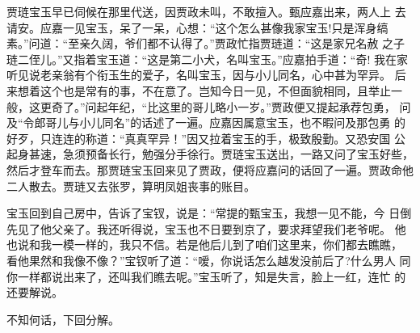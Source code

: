贾琏宝玉早已伺候在那里代送，因贾政未叫，不敢擅入。甄应嘉出来，两人上
去请安。应嘉一见宝玉，呆了一呆，心想：“这个怎么甚像我家宝玉!只是浑身缟
素。”问道：“至亲久阔，爷们都不认得了。”贾政忙指贾琏道：“这是家兄名赦
之子琏二侄儿。”又指着宝玉道：“这是第二小犬，名叫宝玉。”应嘉拍手道：“奇!
我在家听见说老亲翁有个衔玉生的爱子，名叫宝玉，因与小儿同名，心中甚为罕异。
后来想着这个也是常有的事，不在意了。岂知今日一见，不但面貌相同，且举止一
般，这更奇了。”问起年纪，“比这里的哥儿略小一岁。”贾政便又提起承荐包勇，
问及“令郎哥儿与小儿同名”的话述了一遍。应嘉因属意宝玉，也不暇问及那包勇
的好歹，只连连的称道：“真真罕异！”因又拉着宝玉的手，极致殷勤。又恐安国
公起身甚速，急须预备长行，勉强分手徐行。贾琏宝玉送出，一路又问了宝玉好些，
然后才登车而去。那贾琏宝玉回来见了贾政，便将应嘉问的话回了一遍。贾政命他
二人散去。贾琏又去张罗，算明凤姐丧事的账目。

宝玉回到自己房中，告诉了宝钗，说是：“常提的甄宝玉，我想一见不能，今
日倒先见了他父亲了。我还听得说，宝玉也不日要到京了，要求拜望我们老爷呢。
他也说和我一模一样的，我只不信。若是他后儿到了咱们这里来，你们都去瞧瞧，
看他果然和我像不像？”宝钗听了道：“嗳，你说话怎么越发没前后了?什么男人
同你一样都说出来了，还叫我们瞧去呢。”宝玉听了，知是失言，脸上一红，连忙
的还要解说。

不知何话，下回分解。